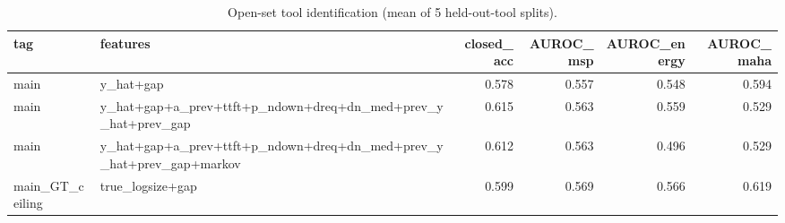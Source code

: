 \begin{table}
\caption{Open-set tool identification (mean of 5 held-out-tool splits).}
\label{tab:tool}
\begin{tabular}{llrrrr}
\toprule
tag & features & closed\_acc & AUROC\_msp & AUROC\_energy & AUROC\_maha \\
\midrule
main & y\_hat+gap & 0.578 & 0.557 & 0.548 & 0.594 \\
main & y\_hat+gap+a\_prev+ttft+p\_ndown+dreq+dn\_med+prev\_y\_hat+prev\_gap & 0.615 & 0.563 & 0.559 & 0.529 \\
main & y\_hat+gap+a\_prev+ttft+p\_ndown+dreq+dn\_med+prev\_y\_hat+prev\_gap+markov & 0.612 & 0.563 & 0.496 & 0.529 \\
main\_GT\_ceiling & true\_logsize+gap & 0.599 & 0.569 & 0.566 & 0.619 \\
\bottomrule
\end{tabular}
\end{table}
